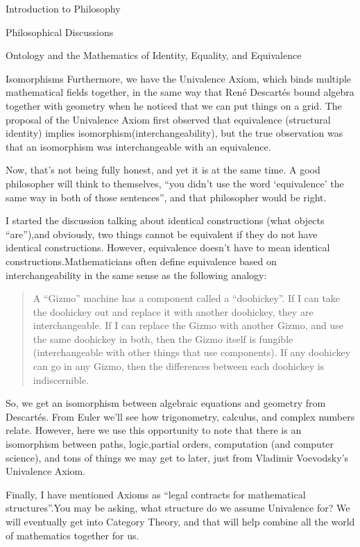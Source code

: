 \begin{chapter}{Introduction to Philosophy}
\begin{section}{Philosophical Discussions}
\begin{subsection}{Ontology and the Mathematics of Identity, Equality, and Equivalence}
\begin{subsubsection}{Isomorphisms}
                Furthermore, we have the Univalence Axiom, which binds multiple mathematical fields together, in the same way that René Descartés bound algebra together with geometry when he noticed that we can put things on a grid. The proposal of the Univalence Axiom first observed that equivalence (structural identity) implies isomorphism(interchangeability), but the true observation was that an isomorphism was interchangeable with an equivalence.
                
                Now, that's not being fully honest, and yet it is at the same time. A good philosopher will think to themselves, ``you didn't use the word `equivalence' the same way in both of those sentences'', and that philosopher would be right.
                
                I started the discussion talking about identical constructions (what objects ``are''),and obviously, two things cannot be equivalent if they do not have identical constructions. However, equivalence doesn't have to mean identical constructions.Mathematicians often define equivalence based on interchangeability in the same sense as the following analogy:
                
                \begin{quote}
                    A ``Gizmo'' machine has a component called a ``doohickey''. If I can take the doohickey out and replace it with another doohickey, they are interchangeable. If I can replace the Gizmo with another Gizmo, and use the same doohickey in both, then the Gizmo itself is fungible (interchangeable with other things that use components). If any doohickey can go in any Gizmo, then the differences between each doohickey is indiscernible.
                \end{quote}
                
                So, we get an isomorphism between algebraic equations and geometry from Descartés. From Euler we'll see how trigonometry, calculus, and complex numbers relate. However, here we use this opportunity to note that there is an isomorphism between paths, logic,partial orders, computation (and computer science), and tons of things we may get to later, just from Vladimir Voevodsky's Univalence Axiom.
                
                Finally, I have mentioned Axioms as ``legal contracts for mathematical structures''.You may be asking, what structure do we assume Univalence for? We will eventually get into Category Theory, and that will help combine all the world of mathematics together for us.
                

\end{subsubsection}
\end{subsection}
\end{section}
\end{chapter}
